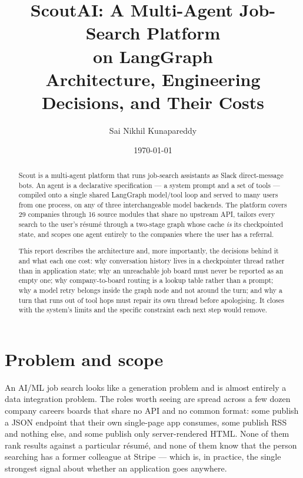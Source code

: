 \documentclass[11pt,a4paper]{article}
\title{\vspace{-1.2cm}\textbf{ScoutAI: A Multi-Agent Job-Search Platform\\on LangGraph}\\[2mm]
  \large Architecture, Engineering Decisions, and Their Costs}
\author{Sai Nikhil Kunapareddy}
\date{\today}
\begin{document}
\maketitle
\thispagestyle{fancy}

\begin{abstract}
\noindent
Scout is a multi-agent platform that runs job-search assistants as Slack direct-message
bots. An agent is a declarative specification --- a system prompt and a set of tools ---
compiled onto a single shared LangGraph model/tool loop and served to many users from one
process, on any of three interchangeable model backends. The platform covers 29 companies
through 16 source modules that share no upstream API, tailors every search to the user's
résumé through a two-stage graph whose cache \emph{is} its checkpointed state, and scopes
one agent entirely to the companies where the user has a referral.

This report describes the architecture and, more importantly, the decisions behind it and
what each one cost: why conversation history lives in a checkpointer thread rather than in
application state; why an unreachable job board must never be reported as an empty one;
why company-to-board routing is a lookup table rather than a prompt; why a model retry
belongs inside the graph node and not around the turn; and why a turn that runs out of tool
hops must repair its own thread before apologising. It closes with the system's limits and
the specific constraint each next step would remove.
\end{abstract}

\vspace{2mm}
{\small\tableofcontents}
\vspace{4mm}

\section{Problem and scope}

An AI/ML job search looks like a generation problem and is almost entirely a data
integration problem. The roles worth seeing are spread across a few dozen company careers
boards that share no API and no common format: some publish a JSON endpoint that their own
single-page app consumes, some publish RSS and nothing else, and some publish only
server-rendered HTML. None of them rank results against a particular résumé, and none of
them know that the person searching has a former colleague at Stripe --- which is, in
practice, the single strongest signal about whether an application goes anywhere.
\end{document}
